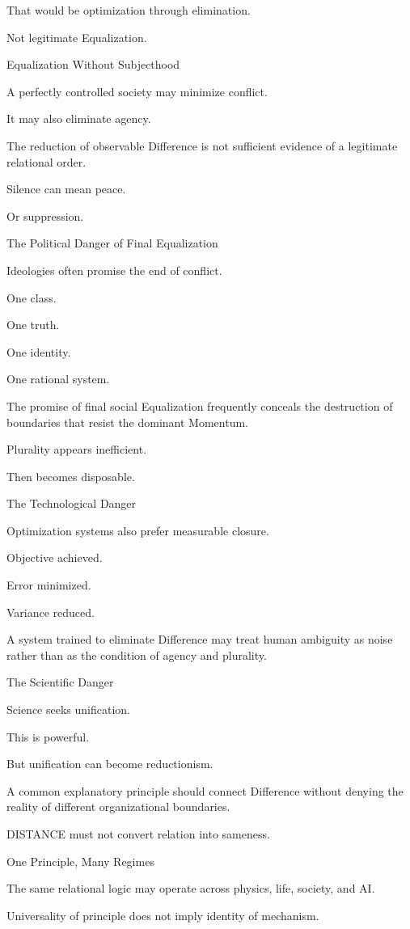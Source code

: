 That would be optimization through elimination.

Not legitimate Equalization.

Equalization Without Subjecthood

A perfectly controlled society may minimize conflict.

It may also eliminate agency.

The reduction of observable Difference is not sufficient evidence of a legitimate relational order.

Silence can mean peace.

Or suppression.

The Political Danger of Final Equalization

Ideologies often promise the end of conflict.

One class.

One truth.

One identity.

One rational system.

The promise of final social Equalization frequently conceals the destruction of boundaries that resist the dominant Momentum.

Plurality appears inefficient.

Then becomes disposable.

The Technological Danger

Optimization systems also prefer measurable closure.

Objective achieved.

Error minimized.

Variance reduced.

A system trained to eliminate Difference may treat human ambiguity as noise rather than as the condition of agency and plurality.

The Scientific Danger

Science seeks unification.

This is powerful.

But unification can become reductionism.

A common explanatory principle should connect Difference without denying the reality of different organizational boundaries.

DISTANCE must not convert relation into sameness.

One Principle, Many Regimes

The same relational logic may operate across physics, life, society, and AI.

Universality of principle does not imply identity of mechanism.

